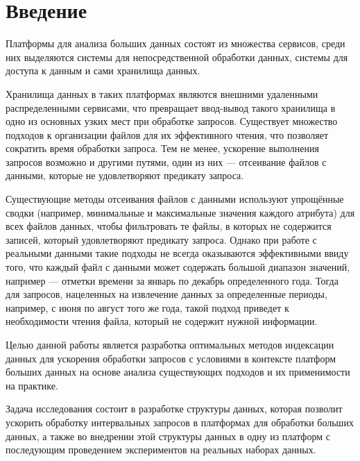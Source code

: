 \section*{Введение}

Платформы для анализа больших данных состоят из множества сервисов, среди них  выделяются системы для непосредственной обработки данных, системы для доступа к данным и сами хранилища данных.

Хранилища данных в таких платформах являются внешними удаленными распределенными сервисами, что превращает ввод-вывод такого хранилища в одно из основных узких мест при обработке запросов. Существует множество подходов к организации файлов для их эффективного чтения, что позволяет сократить время  обработки запроса. Тем не менее, ускорение выполнения запросов возможно и другими путями, один из них --- отсеивание файлов с данными, которые не удовлетворяют предикату запроса.

Существующие методы отсеивания файлов с данными используют упрощённые сводки (например, минимальные и максимальные значения каждого атрибута) для всех файлов данных, чтобы фильтровать те файлы, в которых не содержится записей, который удовлетворяют предикату запроса. Однако при работе с реальными данными такие подходы не всегда оказываются эффективными ввиду того, что каждый файл с данными может содержать большой диапазон значений, например --- отметки времени за январь по декабрь определенного года. Тогда для запросов, нацеленных на извлечение данных за определенные периоды, например, с июня по август того же года, такой подход приведет к необходимости чтения файла, который не содержит нужной информации.

Целью данной работы является разработка оптимальных методов индексации данных для ускорения обработки запросов с условиями в контексте платформ больших данных на основе анализа существующих подходов и их применимости на практике.

Задача исследования состоит в разработке структуры данных, которая позволит ускорить обработку интервальных запросов в платформах для обработки больших данных, а также во внедрении этой структуры данных в одну из платформ с последующим проведением экспериментов на реальных наборах данных. \cite{tex, latex}
